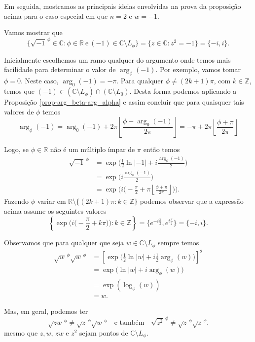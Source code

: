 Em seguida, mostramos as principais ideias envolvidas na prova da 
proposição acima para o caso especial em que $n=2$ e $w=-1$. 

\begin{exemplo}
\label{exemplo-raiz-menos-um} 
Vamos mostrar que 
\[
\{ \sqrt{-1}^{\,\phi} \in \mathbb{C}: \phi\in\mathbb{R}\ \text{e}\ (-1)\in 
\mathbb{C}\setminus L_{\phi} \}
=
\{ z\in\mathbb{C}: z^2=-1\}
=
\{-i,i\}.
\]
\end{exemplo}


Inicialmente escolhemos um ramo qualquer do argumento onde temos mais facilidade 
para determinar o valor de $\arg_{\phi}(-1)$. Por exemplo, vamos tomar $\phi=0$.
Neste caso, $\arg_{0}(-1)=-\pi$. Para qualquer $\phi\neq (2k+1)\pi$, com $k\in\mathbb{Z}$,
temos que $(-1)\in (\mathbb{C}\setminus L_{\phi})\cap (\mathbb{C}\setminus L_{0})$.
Desta forma podemos aplicando a Proposição \ref{prop-arg_beta-arg_alpha} e assim concluir que
para quaisquer tais valores de $\phi$ temos 
\[
\arg_{\phi}(-1) = \arg_{0}(-1) + 2\pi
\left\lfloor \frac{\phi-\arg_{0}(-1)}{2\pi}\right\rfloor 
=
-\pi + 2\pi
\left\lfloor \frac{\phi+\pi}{2\pi}\right\rfloor 
\]

Logo, se $\phi\in\mathbb{R}$ não é um múltiplo ímpar
de $\pi$ então temos 
\begin{align*}
\sqrt{-1}^{\,\phi} 
&=
\exp\Big(\frac{1}{2}\ln|-1|+i\frac{\arg_{\phi}(-1)}{2}  \Big)
\\[0.3cm]
&=
\exp\Big(i\frac{\arg_{\phi}(-1)}{2}  \Big)
\\[0.3cm]
&=
\exp\Big(i \big(-\frac{\pi}{2} + \pi
\left\lfloor \frac{\phi+\pi}{2\pi}\right\rfloor \big) \Big).
\end{align*}
Fazendo $\phi$ variar em $\mathbb{R}\setminus\{(2k+1)\pi: k\in\mathbb{Z}\}$
podemos observar que a expressão acima assume os seguintes valores
\[
\left\{\exp\Big(i \big(-\frac{\pi}{2} + k\pi \big)\Big) : k\in\mathbb{Z}\right\} 
=
\{ e^{-i\frac{\pi}{2}}, e^{i\frac{\pi}{2}} \}
=
\{-i,i\}.
\]


\bigskip 

Observamos que para qualquer que seja $w\in \mathbb{C}\setminus L_{\phi}$ sempre temos 
\begin{align*}
\sqrt{w}^{\,\phi} \sqrt{w}^{\,\phi} 
&= 
\left[\exp\Big(\frac{1}{2}\ln|w|+i\frac{1}{2}\arg_{\phi}(w)\Big)\right]^2
\\
&=
\exp\Big(\ln|w|+i\arg_{\phi}(w)\Big)
\\
&=
\exp(\log_{\phi}(w))
\\
&=
w.
\end{align*}

Mas, em geral, podemos ter
\[
\sqrt{zw}^{\,\phi} \neq  \sqrt{z}^{\,\phi} \sqrt{w}^{\,\phi} 
\quad\text{e também}\quad 
\sqrt{z^2}^{\,\phi} \neq  \sqrt{z}^{\,\phi} \sqrt{z}^{\,\phi}.
\]
mesmo que $z, w$, $zw$ e $z^2$ sejam pontos de $\mathbb{C}\setminus L_{\phi}$.